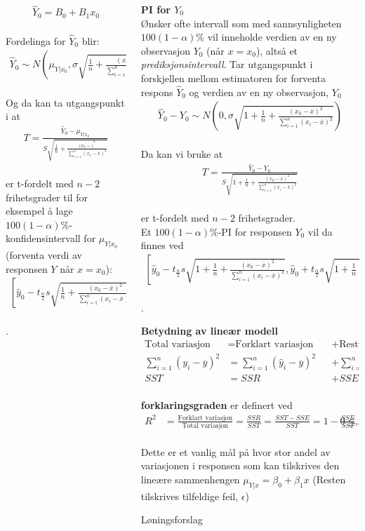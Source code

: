 \documentclass[final,hyperref={pdfpagelabels=false}]{beamer}
\newcommand{\maths}[1]{\vspace{-3mm}\begin{align*}#1\end{align*}\\\vspace{-3mm}}
\newcommand{\ol}[0]{\overline}
\newcommand{\tema}[2]{\footnotesize\raggedright\textbf{#1}\\{#2}\par}
\begin{document}
\begin{frame}{}
\begin{columns}[t]
\begin{column}{.33\linewidth}
\begin{block}{}
{					\maths{\hat Y_0=B_0+B_1x_0}
					Fordelinga for $\hat Y_0$ blir:
					\maths{\hat Y_0 \sim N\left(\mu_{Y|x_0},\sigma\sqrt{\frac{1}{n}+\frac{(x_0-\ol x)^2}{\sum_{i=1}^n(x_i-\ol x)^2}}\right)}
					Og da kan ta utgangspunkt i at
					\maths{T=\frac{\hat Y_0-\mu_{Y|x_0}}{S\sqrt{\frac{1}{n}+\frac{(x_0-\ol)^2}{\sum_{i=1}^n(x_1-\ol x)^2}}}}
					er t-fordelt med $n-2$ frihetsgrader til for eksempel å lage $100(1-\alpha)\%$-konfidensintervall for $\mu_{Y|x_0}$ (forventa verdi av responsen $Y$ når $x=x_0$):
					\maths{\left[\hat y_0 - t_{\frac{\alpha}{2}}s\sqrt{\frac{1}{n}+\frac{(x_0-\ol x)^2}{\sum_{i=1}^n(x_i - \ol x)^2}},\hat y_0 + t_{\frac{\alpha}{2}}s\sqrt{\frac{1}{n}+\frac{(x_0-\ol x)^2}{\sum_{i=1}^n(x_i - \ol x)^2}}\right]}.}
			\end{block}
		\end{column}
		\begin{column}{.33\linewidth}
				\tema{PI for $Y_0$}
				{Ønsker ofte intervall som med sannsynligheten $100(1-\alpha)\%$ vil inneholde verdien av en ny observasjon $Y_0$ (når $x=x_0$), altså et \textit{prediksjonsintervall}. Tar utgangspunkt i forskjellen mellom estimatoren for forventa respons $\hat Y_0$ og verdien av en ny observasjon, $Y_0$
					\maths{\hat Y_0 - Y_0 \sim N\left(0,\sigma\sqrt{1+\frac{1}{n}+\frac{(x_0-\ol x)^2}{\sum_{i=1}^n(x_i-\ol x)^2}}\right)}
					Da kan vi bruke at
					\maths{T=\frac{\hat Y_0-Y_0}{S\sqrt{1+\frac{1}{n}+\frac{(x_0-\ol x)^2}{\sum_{i=1}^n(x_i-\ol x)^2}}}}
					er t-fordelt med $n-2$ frihetsgrader.\\
					Et $100(1-\alpha)\%$-PI for responsen $Y_0$ vil da finnes ved
					\maths{\left[\hat y_0-t_\frac{\alpha}{2}s\sqrt{1+\frac{1}{n}+\frac{(x_0-\ol x)^2}{\sum_{i=1}^n(x_i-\ol x)^2}},\hat y_0+t_\frac{\alpha}{2}s\sqrt{1+\frac{1}{n}+\frac{(x_0-\ol x)^2}{\sum_{i=1}^n(x_i-\ol x)^2}}\right]}.
				}
				\tema{Betydning av lineær modell}
				{\maths{\text{Total variasjon}&=\text{Forklart variasjon}&&+\text{Restvariasjon}\\
						\sum_{i=1}^n(y_i-\ol y)^2&=\sum_{i=1}^n(\hat y_i-\ol y)^2 &&+ \sum_{i=1}^n (y_i-\hat y_i)^2\\
						SST&=SSR&&+SSE}
					\textbf{forklaringsgraden} er definert ved
					\maths{R^2&=\frac{\text{Forklart variasjon}}{\text{Total variasjon}}=\frac{SSR}{SST}=\frac{SST-SSE}{SST}=1-\frac{SSE}{SST}, &0 \leq R^2 \leq 1}
					Dette er et vanlig mål på hvor stor andel av variasjonen i responsen som kan tilskrives den lineære sammenhengen $\mu_{Y|x}=\beta_0+\beta_1 x$ (Resten tilskrives tilfeldige feil, $\epsilon$)}
			\begin{block}{Løningsforslag}

\end{block}
\end{column}
\end{columns}
\end{frame}
\end{document}
